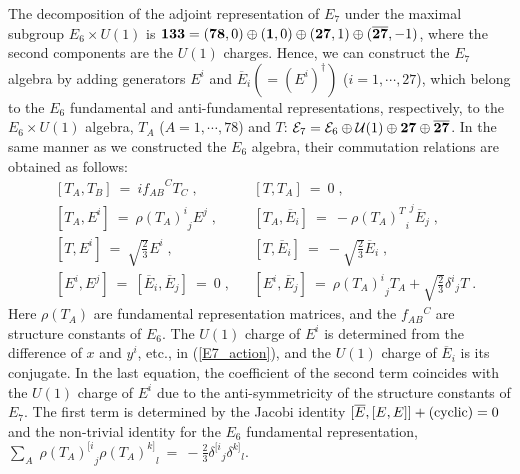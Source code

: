 \documentclass[a4paper,11pt]{article}
\newcommand{\ol}{\overline}
\begin{document}
{\begin{appendix}
The decomposition of the adjoint representation of $E_7$ 
under the maximal subgroup $E_6 \times U(1)$ is 
${\bf 133} = ({\bf 78},0) \oplus ({\bf 1},0)
\oplus ({\bf 27},1) \oplus ({\bf \ol{27}},-1)$, 
where the second components are the $U(1)$ charges.
Hence, we can construct the $E_7$ algebra 
by adding generators $E^i$ and $\ol{E}_i (= (E^i)^{\dagger})$ 
($i=1,\cdots,27$), which belong to 
the $E_6$ fundamental and anti-fundamental 
representations, respectively, 
to the $E_6 \times U(1)$ algebra, 
$T_A$ ($A=1,\cdots,78$) and $T$: 
${\cal E}_7 = {\cal E}_6 \oplus {\cal U}(1) 
\oplus {\bf 27} \oplus {\bf \ol{27}}$.
In the same manner as we constructed 
the $E_6$ algebra, 
their commutation relations are obtained as follows: 
\begin{align}
&[T_A,T_B] \ = \ i {f_{AB}}^C T_C \; , && [T, T_A] \ = \ 0 \; ,
\nonumber \\
&[T_A,E^i] \ = \ {\rho(T_A)^i}_j E^j \; , &&
   [T_A,\ol{E}_i] \ = \ -{{\rho(T_A)^T}_i}^j \ol{E}_j \; , \nonumber \\
&[T, E^i] \ = \ \sqrt{\frac{2}{3}} E^i \; , &&
   [T, \ol{E}_i] \ = \ - \sqrt{\frac{2}{3}} \ol{E}_i \; , \nonumber \\
&[E^i,E^j] \ = \ [\ol{E}_i,\ol{E}_j ] \ = \ 0 \; , &&
[E^i,\ol{E}_j] \ = \ {\rho(T_A)^i}_j T_A + \sqrt{\frac{2}{3}}
{\delta^i}_j T \; .
\end{align}
Here $\rho(T_A)$ are fundamental representation matrices, 
and the $f_{AB}{}^C$ are structure constants of $E_6$.
The $U(1)$ charge of $E^i$ is determined from 
the difference of $x$ and $y^i$, etc., in (\ref{E7_action}), 
and the $U(1)$ charge of $\ol{E}_i$ is its conjugate.  
In the last equation, 
the coefficient of the second term coincides with 
the $U(1)$ charge of $E^i$ due to the anti-symmetricity 
of the structure constants of $E_7$. 
The first term is determined by 
the Jacobi identity $[\ol{E},[E,E]] + ({\rm cyclic}) = 0$ and 
the non-trivial identity for 
the $E_6$ fundamental representation,
$\sum_A \; {\rho(T_A)^{[i}}_j {\rho(T_A)^{k]}}_l
  \ = \ -\frac{2}{3} {\delta^{[i}}_j {\delta^{k]}}_l$.


\end{appendix}}
\end{document}
